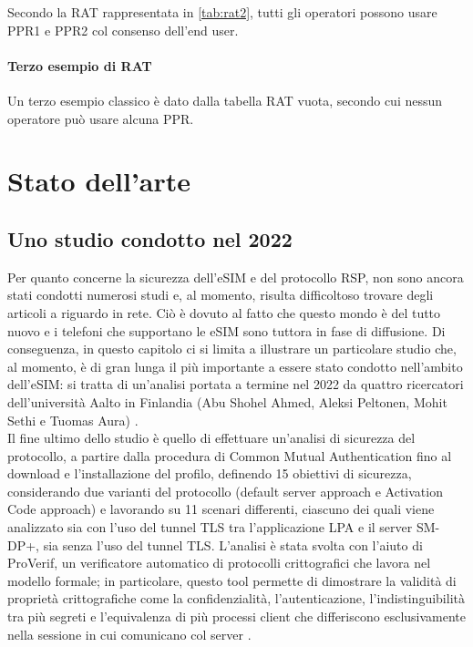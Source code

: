 \documentclass[10pt, oneside]{book}
\begin{document}
\noindent Secondo la RAT rappresentata in \ref{tab:rat2}, tutti gli operatori possono usare PPR1 e PPR2 col consenso dell'end user.

\subsubsection{Terzo esempio di RAT}
Un terzo esempio classico è dato dalla tabella RAT vuota, secondo cui nessun operatore può usare alcuna PPR.

\chapter{Stato dell'arte}
\section{Uno studio condotto nel 2022}
Per quanto concerne la sicurezza dell'eSIM e del protocollo RSP, non sono ancora stati condotti numerosi studi e, al momento, risulta difficoltoso trovare degli articoli a riguardo in rete. Ciò è dovuto al fatto che questo mondo è del tutto nuovo e i telefoni che supportano le eSIM sono tuttora in fase di diffusione. Di conseguenza, in questo capitolo ci si limita a illustrare un particolare studio che, al momento, è di gran lunga il più importante a essere stato condotto nell'ambito dell'eSIM: si tratta di un'analisi portata a termine nel 2022 da quattro ricercatori dell'università Aalto in Finlandia (Abu Shohel Ahmed, Aleksi Peltonen, Mohit Sethi e Tuomas Aura) \cite{Sec-analysis}.\\
Il fine ultimo dello studio è quello di effettuare un'analisi di sicurezza del protocollo, a partire dalla procedura di Common Mutual Authentication fino al download e l'installazione del profilo, definendo 15 obiettivi di sicurezza, considerando due varianti del protocollo (default server approach e Activation Code approach) e lavorando su 11 scenari differenti, ciascuno dei quali viene analizzato sia con l'uso del tunnel TLS tra l'applicazione LPA e il server SM-DP+, sia senza l'uso del tunnel TLS. L'analisi è stata svolta con l'aiuto di ProVerif, un verificatore automatico di protocolli crittografici che lavora nel modello formale; in particolare, questo tool permette di dimostrare la validità di proprietà crittografiche come la confidenzialità, l'autenticazione, l'indistinguibilità tra più segreti e l'equivalenza di più processi client che differiscono esclusivamente nella sessione in cui comunicano col server \cite{ProVerif}.\\
\end{document}
